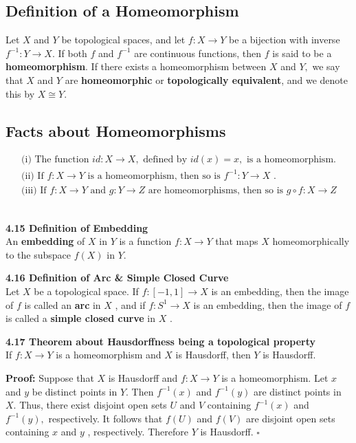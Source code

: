 \documentclass[12pt]{article}
\newenvironment{proofed}[1][]{\par \medskip \noindent \textbf{#1 Proof: }}{\hfill$\square$}
\newenvironment{defn}[2][]{\par \medskip \noindent \textbf{#1 Definition of \large#2 \medskip \\}}{\rmfamily \medskip}
\newenvironment{thm}[2][]{\par \medskip \noindent \textbf{#1 Theorem about \large#2 \medskip \\}}{\rmfamily \medskip}
\begin{document}
	\subsection{Definition of a Homeomorphism}
		Let $X$ and $Y$ be topological spaces, and let $f : X \rightarrow Y$ be a bijection with inverse $f ^ { - 1 } : Y \rightarrow X .$ If both $f$ and $f ^ { - 1 }$ are continuous functions, then $f$ is said to be a \textbf{homeomorphism}. If there exists a homeomorphism between $X$ and $Y ,$ we say that $X$ and $Y$ are \textbf{homeomorphic} or \textbf{topologically equivalent}, and we denote this by $X \cong Y .$
	\subsection{Facts about Homeomorphisms}
		\[\begin{array} { l } { \text { (i) The function } i d : X \rightarrow X , \text { defined by } i d ( x ) = x , \text { is a homeomorphism. } } \\
		 { \text { (ii) If } f : X \rightarrow Y \text { is a homeomorphism, then so is } f ^ { - 1 } : Y \rightarrow X \text { . } } \\
		  { \text { (iii) If } f : X \rightarrow Y \text { and } g : Y \rightarrow Z \text { are homeomorphisms, then so is }  g \circ f : X \rightarrow Z } \end{array}\]
		 \\
	\begin{defn}[4.15]{Embedding}
			An \textbf{embedding} of $X$ in $Y$ is a function $f : X \rightarrow Y$ that
			maps $X$ homeomorphically to the subspace $f ( X )$ in $Y .$
	\end{defn} 
	\begin{defn}[4.16]{Arc \& Simple Closed Curve}
			Let $X$ be a topological space. If $f : [ - 1,1 ] \rightarrow X$ is an
			embedding, then the image of $f$ is called an \textbf{arc} in $X$ , and if $f : S ^ { 1 } \rightarrow X$ is an embedding, then the image of $f$ is called a \textbf{simple closed curve} in $X$ .
	\end{defn}
	\begin{thm}[4.17]{Hausdorffness being a topological property}	  
		If $f : X \rightarrow Y$ is a homeomorphism and $X$ is Hausdorff,
		then $Y$ is Hausdorff.
		\begin{proofed}
			Suppose that $X$ is Hausdorff and $f : X \rightarrow Y$ is a homeomorphism. Let $x$ and $y$ be distinct points in $Y .$ Then $f ^ { - 1 } ( x )$ and $f ^ { - 1 } ( y )$ are distinct points in $X .$ Thus, there exist disjoint open sets $U$ and $V$ containing $f ^ { - 1 } ( x )$ and $f ^ { - 1 } ( y ) ,$ respectively. It follows that $f ( U )$ and
			$f ( V )$ are disjoint open sets containing $x$ and $y$ , respectively. Therefore
			$Y$ is Hausdorff.
		\end{proofed}
	\end{thm}
	
\end{document}
